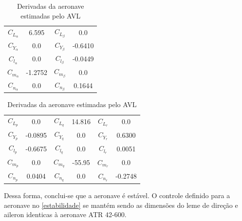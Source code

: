 \begin{table}[H]
\centering
\begin{tabular}{cccc}
\toprule
$ C_{L_{\alpha}} $ &   6.595 & $ C_{L_{\beta}} $ &     0.0  \\ [0.3cm]
$ C_{Y_{\alpha}} $ &     0.0 & $ C_{Y_{\beta}} $ & -0.6410  \\ [0.3cm]
$ C_{l_{\alpha}} $ &     0.0 & $ C_{l_{\beta}} $ & -0.0449  \\ [0.3cm]
$ C_{m_{\alpha}} $ & -1.2752 & $ C_{m_{\beta}} $ &     0.0  \\ [0.3cm]
$ C_{n_{\alpha}} $ &     0.0 & $ C_{n_{\beta}} $ &  0.1644  \\ [0.3cm]
\bottomrule
\end{tabular}
\begin{tabular}{cccccc}
\toprule
$ C_{L_{p}} $ &     0.0 & $ C_{L_{q}} $ & 14.816  & $ C_{L_{r}} $ &   0.0   \\ [0.3cm]
$ C_{Y_{p}} $ & -0.0895 & $ C_{Y_{q}} $ &    0.0  & $ C_{Y_{r}} $ & 0.6300  \\ [0.3cm]
$ C_{l_{p}} $ & -0.6675 & $ C_{l_{q}} $ &    0.0  & $ C_{l_{r}} $ & 0.0051 \\ [0.3cm]
$ C_{m_{p}} $ &     0.0 & $ C_{m_{q}} $ & -55.95  & $ C_{m_{r}} $ &   0.0  \\ [0.3cm]
$ C_{n_{p}} $ &  0.0404 & $ C_{n_{q}} $ &    0.0  & $ C_{n_{r}} $ & -0.2748 \\ [0.3cm]
\bottomrule
\end{tabular}
\caption[Derivadas da aeronave estimadas pelo AVL]{Derivadas da aeronave estimadas pelo AVL}
\label{tbl:derivadas_avl}
\end{table}

Dessa forma, conclui-se que a aeronave é estável. O controle definido para a aeronave no \autoref{estabilidade} se mantém sendo as dimensões do leme de direção e aileron identicas à aeronave ATR 42-600.
